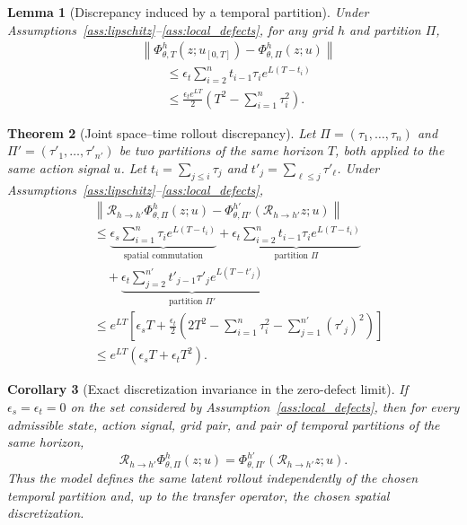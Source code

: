 \documentclass{article}
\theoremstyle{plain}
\newtheorem{theorem}{Theorem}[section]
\newtheorem{lemma}[theorem]{Lemma}
\newtheorem{corollary}[theorem]{Corollary}
\theoremstyle{definition}
\theoremstyle{remark}
\newcommand{\PhiOp}{\Phi}
\newcommand{\Restr}{\mathcal{R}}
\newcommand{\norm}[1]{\left\lVert #1 \right\rVert}
\begin{document}
\begin{lemma}[Discrepancy induced by a temporal partition]
\label{lem:temporal_accumulation}
Under Assumptions~\ref{ass:lipschitz}--\ref{ass:local_defects}, for any grid $h$ and partition $\Pi$,
\begin{align}
&\norm{
\PhiOp^{h}_{\theta,T}(z;u_{[0,T]})
-
\PhiOp^{h}_{\theta,\Pi}(z;u)
}
\nonumber\\
&\qquad\le
\epsilon_t
\sum_{i=2}^{n}
 t_{i-1}\tau_i e^{L(T-t_i)}
\label{eq:temporal_accumulation_sharp}
\\
&\qquad\le
\frac{\epsilon_t e^{LT}}{2}
\left(T^2-\sum_{i=1}^{n}\tau_i^2\right).
\label{eq:temporal_accumulation_coarse}
\end{align}
\end{lemma}

\begin{theorem}[Joint space--time rollout discrepancy]
\label{thm:joint_discrepancy}
Let $\Pi=(\tau_1,\ldots,\tau_n)$ and $\Pi'=(\tau'_1,\ldots,\tau'_{n'})$ be two partitions of the same horizon $T$, both applied to the same action signal $u$. Let $t_i=\sum_{j\le i}\tau_j$ and $t'_j=\sum_{\ell\le j}\tau'_{\ell}$. Under Assumptions~\ref{ass:lipschitz}--\ref{ass:local_defects},
\begin{align}
&\norm{
\Restr_{h\rightarrow h'}
\PhiOp^{h}_{\theta,\Pi}(z;u)
-
\PhiOp^{h'}_{\theta,\Pi'}
(\Restr_{h\rightarrow h'}z;u)
}
\nonumber\\
&\le
\underbrace{
\epsilon_s\sum_{i=1}^{n}\tau_i e^{L(T-t_i)}
}_{\text{spatial commutation}}
+
\underbrace{
\epsilon_t\sum_{i=2}^{n}t_{i-1}\tau_i e^{L(T-t_i)}
}_{\text{partition }\Pi}
\nonumber\\
&\quad+
\underbrace{
\epsilon_t\sum_{j=2}^{n'}t'_{j-1}\tau'_j e^{L(T-t'_j)}
}_{\text{partition }\Pi'}
\label{eq:joint_bound_sharp}
\\
&\le
 e^{LT}
 \left[
    \epsilon_s T
    +
    \frac{\epsilon_t}{2}
    \left(
    2T^2
    -\sum_{i=1}^{n}\tau_i^2
    -\sum_{j=1}^{n'}(\tau'_j)^2
    \right)
 \right]
\label{eq:main_bound}
\\
&\le e^{LT}(\epsilon_sT+\epsilon_tT^2).
\label{eq:main_bound_simple}
\end{align}
\end{theorem}

\begin{corollary}[Exact discretization invariance in the zero-defect limit]
\label{cor:zero_defect}
If $\epsilon_s=\epsilon_t=0$ on the set considered by Assumption~\ref{ass:local_defects}, then for every admissible state, action signal, grid pair, and pair of temporal partitions of the same horizon,
\begin{equation}
\Restr_{h\rightarrow h'}
\PhiOp^{h}_{\theta,\Pi}(z;u)
=
\PhiOp^{h'}_{\theta,\Pi'}
(\Restr_{h\rightarrow h'}z;u).
\end{equation}
Thus the model defines the same latent rollout independently of the chosen temporal partition and, up to the transfer operator, the chosen spatial discretization.
\end{corollary}
\end{document}
